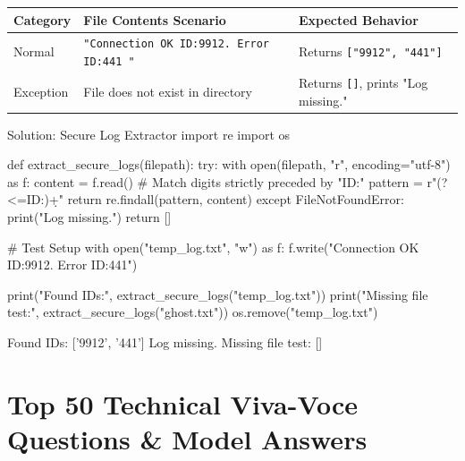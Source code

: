 \begin{table}[htbp]
\centering
\small
\begin{tabularx}{\linewidth}{lXl}
\toprule
\textbf{Category} & \textbf{File Contents Scenario} & \textbf{Expected Behavior} \\
\midrule
Normal & \texttt{"Connection OK ID:9912. Error ID:441 "} & Returns \texttt{["9912", "441"]} \\
Exception & File does not exist in directory & Returns \texttt{[]}, prints "Log missing." \\
\bottomrule
\end{tabularx}
\end{table}

\begin{pythoncode}[]{Solution: Secure Log Extractor}
import re
import os

def extract_secure_logs(filepath):
    try:
        with open(filepath, "r", encoding="utf-8") as f:
            content = f.read()
            # Match digits strictly preceded by "ID:"
            pattern = r"(?<=ID:)\d+"
            return re.findall(pattern, content)
    except FileNotFoundError:
        print("Log missing.")
        return []

# Test Setup
with open("temp_log.txt", "w") as f:
    f.write("Connection OK ID:9912. Error ID:441")

print("Found IDs:", extract_secure_logs("temp_log.txt"))
print("Missing file test:", extract_secure_logs("ghost.txt"))
os.remove("temp_log.txt")
\end{pythoncode}
\begin{outputbox}
Found IDs: ['9912', '441']
Log missing.
Missing file test: []
\end{outputbox}

\section{Top 50 Technical Viva-Voce Questions \& Model Answers}


